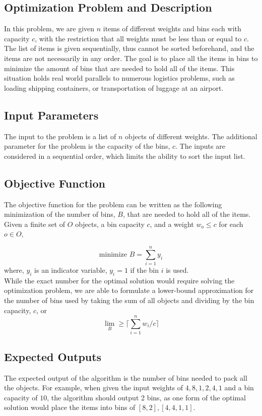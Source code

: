 \documentclass[11pt]{article}
\begin{document}
\begin{multicols}{2}
	\section{Optimization Problem and Description}
	In this problem, we are given ${n}$ items of different weights and bins each with capacity ${c}$,
	with the restriction that all weights must be less than or equal to ${c}$. The list of items is
	given sequentially, thus cannot be sorted beforehand, and the items are not necessarily in any
	order. The goal is to place all the items in bins to minimize the amount of bins that are needed to
	hold all of the items. This situation holds real world parallels to numerous logistics problems, such as loading
	shipping containers, or transportation of luggage at an airport.
	\subsection{Input Parameters}
	The input to the problem is a list of ${n}$ objects of different weights. The additional parameter
	for the problem is the capacity of the bins, ${c}$. The inputs are considered in a sequential order,
	which limits the ability to sort the input list.

	\subsection{Objective Function}
	The objective function for the problem can be written as the following minimization of the number of
	bins, ${B}$, that are needed to hold all of the items. Given a finite set of ${O}$ objects, a bin
	capacity ${c}$, and a
	weight ${w_o \leq c}$ for each ${o \in O}$,

	\begin{equation}
		\text{minimize } B  = \sum_{i=1}^{n} y_i
	\end{equation}
	where, ${y_i}$ is an indicator variable, ${y_i = 1}$ if the bin ${i}$ is used. \\
	While the exact number for the optimal solution would require solving the optimization problem, we
	are able to formulate a lower-bound approximation for the number of bins used by taking the sum of
	all objects and dividing by the bin capacity, ${c}$, or
	\begin{equation}
		\lim_{B} \geq \lceil \sum_{i=1}^{n} w_i / c \rceil
	\end{equation}
	\subsection{Expected Outputs}
	The expected output of the algorithm is the number of bins needed to pack all the objects.
	For example, when given the input weights of ${{4, 8, 1, 2, 4, 1}}$ and a bin capacity of
	${10}$,
	the algorithm should output 2 bins, as one form of the optimal solution would place the items into bins of
	${[8,2], [4,4,1,1]}$.


\end{multicols}
\end{document}
